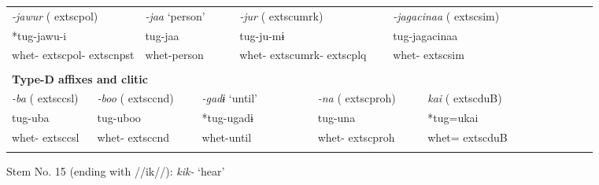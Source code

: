 \begin{tabularx}{\textwidth}{XXXXXXXXXXXXXXXXXXXX}
\multicolumn{3}{X}{{ \textit{{}-jawur} (	extsc{pol})}} & \multicolumn{2}{X}{{ \textit{{}-jaa} ‘person’}} & \multicolumn{3}{X}{{ \textit{{}-jur} (	extsc{umrk})}} & \multicolumn{4}{X}{{ \textit{{}-jagacinaa} (	extsc{sim})}} & \multicolumn{8}{X}{}\\
\multicolumn{3}{X}{{ *tug-jawu-i}} & \multicolumn{2}{X}{{ tug-jaa}} & \multicolumn{3}{X}{tug-ju-mɨ} & \multicolumn{4}{X}{{ tug-jagacinaa}} & \multicolumn{8}{X}{}\\
\multicolumn{3}{X}{whet-	extsc{pol}-	extsc{npst}} & \multicolumn{2}{X}{whet-person} & \multicolumn{3}{X}{whet-	extsc{umrk}-	extsc{plq}} & \multicolumn{4}{X}{whet-	extsc{sim}} & \multicolumn{8}{X}{}\\
\multicolumn{20}{X}{}\\
\multicolumn{20}{X}{{\bfseries Type-D affixes and clitic}}\\
\multicolumn{2}{X}{{ \textit{{}-ba} (	extsc{csl})}} & \multicolumn{2}{X}{{ \textit{{}-boo} (	extsc{cnd})}} & \multicolumn{2}{X}{{ \textit{{}-gadɨ} ‘until’}} & \multicolumn{3}{X}{{ \textit{{}-na} (	extsc{proh})}} & \multicolumn{5}{X}{{ \textit{kai} (	extsc{du}B)}} & \multicolumn{6}{X}{}\\
\multicolumn{2}{X}{{ tug-uba}} & \multicolumn{2}{X}{{ tug-uboo}} & \multicolumn{2}{X}{{ *tug-ugadɨ}} & \multicolumn{3}{X}{{ tug-una}} & \multicolumn{5}{X}{{ *tug=ukai}} & \multicolumn{6}{X}{}\\
\multicolumn{2}{X}{whet-	extsc{csl}} & \multicolumn{2}{X}{whet-	extsc{cnd}} & \multicolumn{2}{X}{whet-until} & \multicolumn{3}{X}{whet-	extsc{proh}} & \multicolumn{5}{X}{whet=	extsc{du}B} & \multicolumn{6}{X}{}\\
\lspbottomrule
\end{tabularx}
Stem No. 15 (ending with //ik//): \textit{kik-} ‘hear’

\tablefirsthead{}

